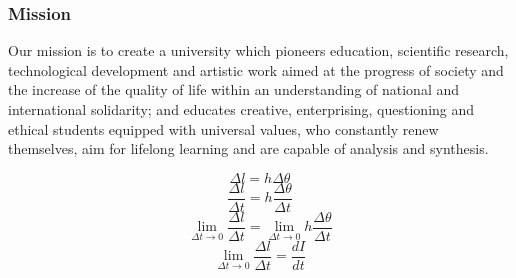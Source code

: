 \subsubsection{Mission}
Our mission is to create a university which pioneers education, scientific research, technological development and artistic work aimed at the progress of society and the increase of the quality of life within an understanding of national and international solidarity; and educates creative, enterprising, questioning and ethical students equipped with universal values, who constantly renew themselves, aim for lifelong learning and are capable of analysis and synthesis.

\begin{equation}
\Delta  l = h \Delta \theta
\end{equation}
\begin{equation}
\frac{\Delta l}{\Delta t} = h \frac{\Delta \theta}{\Delta t}
\end{equation}
\begin{equation}
\lim_{\Delta t \rightarrow 0}\frac{\Delta l}{\Delta t} = \lim_{\Delta t \rightarrow 0} h \frac{\Delta \theta}{\Delta t}
\end{equation}
\begin{equation}
\lim_{\Delta t \rightarrow 0}\frac{\Delta l}{\Delta t} = \frac{dI}{dt}
\end{equation}
